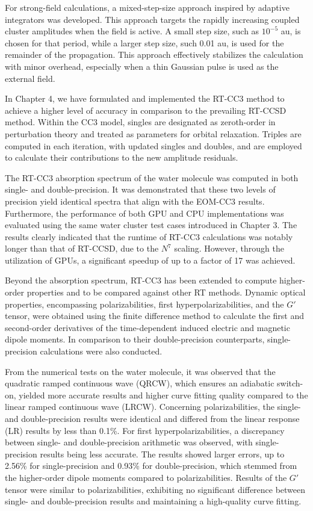 For strong-field calculations, a mixed-step-size approach inspired by adaptive integrators was developed. This approach targets the rapidly increasing coupled cluster amplitudes when the field is active. A small step size, such as $10^{-5}$ au, is chosen for that period, while a larger step size, such 0.01 au, is used for the remainder of the propagation. This approach effectively stabilizes the calculation with minor overhead, especially when a thin Gaussian pulse is used as the external field.

In Chapter 4, we have formulated and implemented the RT-CC3 method to achieve a higher level of accuracy in comparison to the prevailing RT-CCSD method. Within the CC3 model, singles are designated as zeroth-order in perturbation theory and treated as parameters for orbital relaxation. Triples are computed in each iteration, with updated singles and doubles, and are employed to calculate their contributions to the new amplitude residuals.

The RT-CC3 absorption spectrum of the water molecule was computed in both single- and double-precision. It was demonstrated that these two levels of precision yield identical spectra that align with the EOM-CC3 results. Furthermore, the performance of both GPU and CPU implementations was evaluated using the same water cluster test cases introduced in Chapter 3. The results clearly indicated that the runtime of RT-CC3 calculations was notably longer than that of RT-CCSD, due to the $N^{7}$ scaling. However, through the utilization of GPUs, a significant speedup of up to a factor of 17 was achieved.

Beyond the absorption spectrum, RT-CC3 has been extended to compute higher-order properties and to be compared against other RT methods. Dynamic optical properties, encompassing polarizabilities, first hyperpolarizabilities, and the $G'$ tensor, were obtained using the finite difference method to calculate the first and second-order derivatives of the time-dependent induced electric and magnetic dipole moments. In comparison to their double-precision counterparts, single-precision calculations were also conducted.

From the numerical tests on the water molecule, it was observed that the quadratic ramped continuous wave (QRCW), which ensures an adiabatic switch-on, yielded more accurate results and higher curve fitting quality compared to the linear ramped continuous wave (LRCW). Concerning polarizabilities, the single- and double-precision results were identical and differed from the linear response (LR) results by less than 0.1\%. For first hyperpolarizabilities, a discrepancy between single- and double-precision arithmetic was observed, with single-precision results being less accurate. The results showed larger errors, up to 2.56\% for single-precision and 0.93\% for double-precision, which stemmed from the higher-order dipole moments compared to polarizabilities. Results of the $G'$ tensor were similar to polarizabilities, exhibiting no significant difference between single- and double-precision results and maintaining a high-quality curve fitting.


